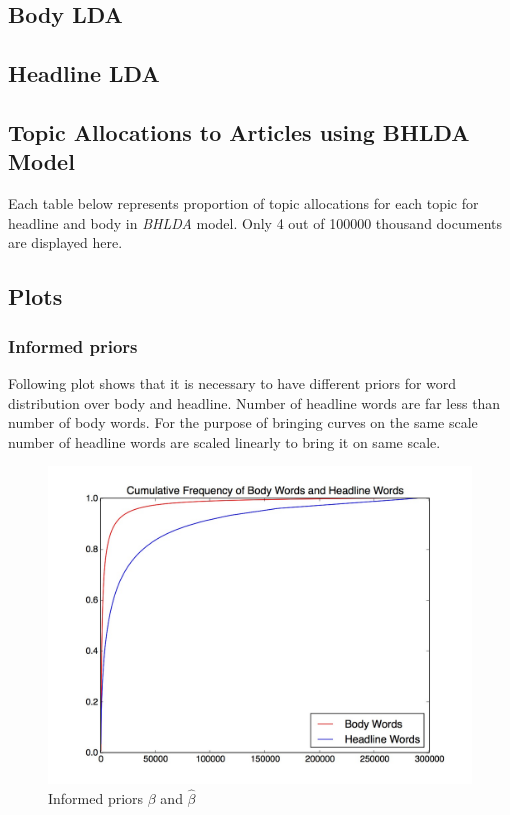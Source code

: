 \documentclass[a4paper]{article}
\begin{document}
\subsection{Body LDA} \label{body lda output}


\subsection{Headline LDA} \label{headline lda output}


\subsection{Topic Allocations to Articles using BHLDA Model} \label{corpus output}
Each table below represents proportion of topic allocations for each topic for headline and body in \emph{BHLDA} model. Only 4 out of 100000 thousand documents are displayed here. 




\subsection{Plots}
\subsubsection{Informed priors}
Following plot shows that it is necessary to have different priors for word distribution over body and headline. Number of headline words are far less than number of body words. For the purpose of bringing curves on the same scale number of headline words are scaled linearly to bring it on same scale.
\begin{figure}[ht]
		\begin{center}
		\includegraphics[width=\columnwidth]{plot.jpeg}
		\caption{Informed priors $\beta$ and $\hat{\beta}$}
		\label{fig:priors}
		\end{center}
\end{figure}
\end{document}
